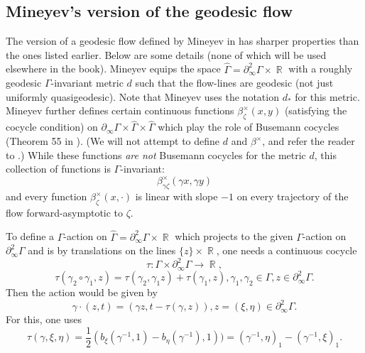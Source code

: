 \documentclass[12pt]{amsbook}%
\theoremstyle{definition}
\theoremstyle{remark}
\numberwithin{section}{chapter}
\numberwithin{subsection}{section}
\numberwithin{figure}{chapter}
\def\half{\frac{1}{2}}
\DeclareMathOperator{\R}{\mathbb{R}}
\def\Ga{\Gamma}
\def\ga{\gamma}
\def\geo{\partial_\infty}
\def\kap{}
\begin{document}
\subsection{Mineyev's version of the geodesic flow} \label{sec:Mineyev's flow}


The version of a geodesic flow defined by Mineyev in \cite{Mineyev2005} has sharper properties than the ones listed earlier. Below are some details 
(none of which will be used elsewhere in the book). 
Mineyev equips the space $\widehat\Ga= \geo^2\Ga \times \R$ with a roughly geodesic $\Ga$-invariant metric $d$ such that 
the flow-lines are geodesic (not just uniformly quasigeodesic). Note that Mineyev uses the notation $d_*$ for this metric. 
Mineyev further defines certain continuous functions 
$\beta^\times_\zeta(x,y)$ (satisfying the cocycle condition) on 
$\geo \Ga\times \widehat\Ga\times \widehat\Ga$ which play the role of  
Busemann cocycles (Theorem 55 in  \cite{Mineyev2005}). (We will not attempt to define $d$ and $\beta^\times$, and refer the reader to \cite{Mineyev2005}.)  
While these functions {\em are not} Busemann cocycles for the metric $d$, this collection of functions is $\Ga$-invariant:
$$
\beta^\times_{\ga \zeta}(\ga x, \ga y)
$$
and  every function $\beta^\times_\zeta(x,\cdot)$  is linear with slope $-1$ on every trajectory of the flow 
forward-asymptotic to $\zeta$. %

To define a $\Ga$-action on $\widehat\Ga= \geo^2\Ga \times \R$ which projects to the given $\Ga$-action on $\geo^2\Ga$ and is by translations on the lines $\{z\}\times \R$, one needs a continuous cocycle 
$$
\tau: \Ga \times \geo^2\Ga\to \R,
$$
$$
\tau(\ga_2\circ \ga_1, z)= \tau(\ga_2, \ga_1 z) + \tau(\ga_1, z), \ga_1, \ga_2\in \Ga, z\in  \geo^2\Ga. 
$$
Then the action would be given by 
$$
\ga \cdot (z, t)= (\ga z, t- \tau(\ga, z)), z=(\xi,\eta)\in \geo^2\Ga. 
$$
For this, one uses
$$
\tau(\ga, \xi, \eta)= \half(b_\xi(\ga^{-1},1) - b_\eta(\ga^{-1}),1))=   (\ga^{-1},\eta)_1 - (\ga^{-1},\xi)_1. 
$$
\end{document}
